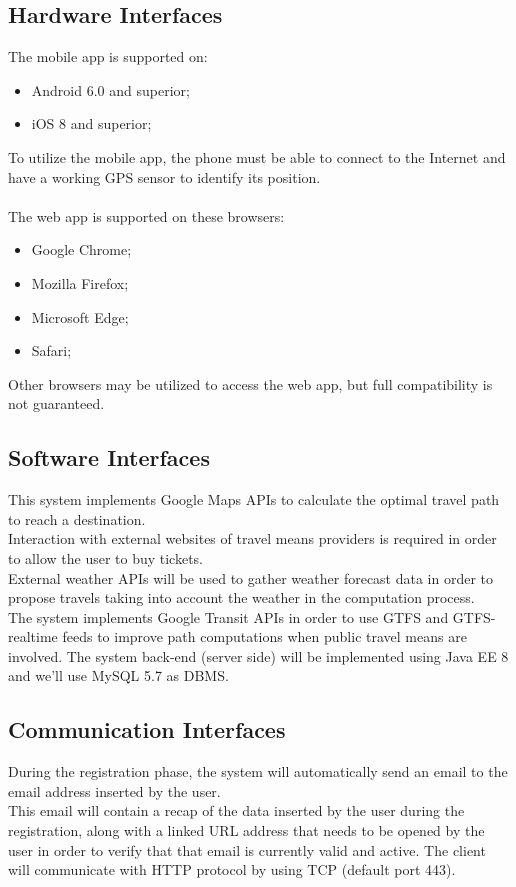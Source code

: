 \newpage
\subsection{Hardware Interfaces}
\label{subsect:Hardware Interfaces}
	The mobile app is supported on:
	\begin{itemize}
		\item Android 6.0 and superior;
		\item iOS 8 and superior;
	\end{itemize}
	To utilize the mobile app, the phone must be able to connect to the Internet and have a working GPS sensor to identify its position. \\ \\
	The web app is supported on these browsers:
	\begin{itemize}
		\item Google Chrome;
		\item Mozilla Firefox;
		\item Microsoft Edge;
		\item Safari;
	\end{itemize}
	Other browsers may be utilized to access the web app, but full compatibility is not guaranteed.
\subsection{Software Interfaces}
\label{subsect:Software Interfaces}
	This system implements Google Maps APIs to calculate the optimal travel path to reach a destination. \\
	Interaction with external websites of travel means providers is required in order to allow the user to buy tickets. \\
	External weather APIs will be used to gather weather forecast data in order to propose travels taking into account the weather in the computation process. \\
	The system implements Google Transit APIs in order to use GTFS and GTFS-realtime feeds to improve path computations when public travel means are involved.
	The system back-end (server side) will be implemented using Java EE 8 and we'll use MySQL 5.7 as DBMS.
	
	
\subsection{Communication Interfaces}
\label{subsect:Communication Interfaces}
	During the registration phase, the system will automatically send an email to the email address inserted by the user. \\
	This email will contain a recap of the data inserted by the user during the registration, along with a linked URL address that needs to be opened by the user in order to verify that that email is currently valid and active.
	The client will communicate with HTTP protocol by using TCP (default port 443).